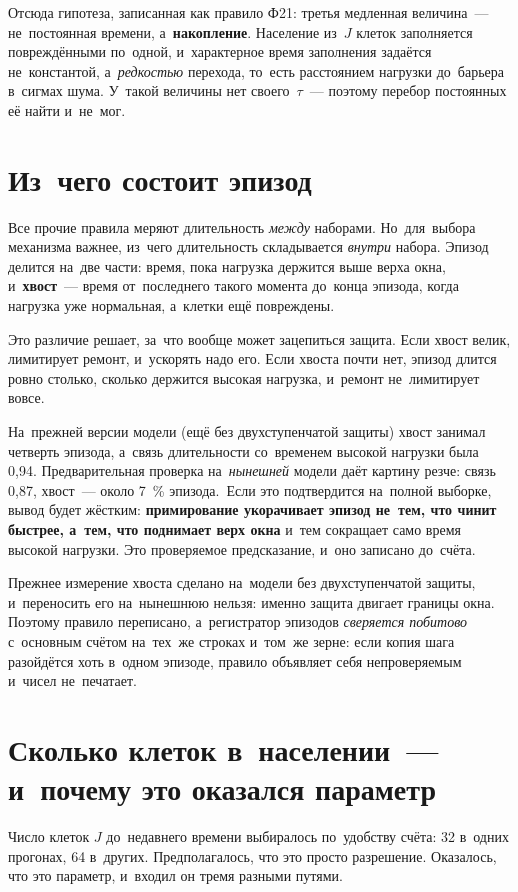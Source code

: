 Отсюда гипотеза, записанная как правило Ф21: третья медленная величина~--- не~постоянная времени, а~\textbf{накопление}. Население из~$J$ клеток заполняется повреждёнными по~одной, и~характерное время заполнения задаётся не~константой, а~\emph{редкостью} перехода, то~есть расстоянием нагрузки до~барьера в~сигмах шума. У~такой величины нет своего~$\tau$~--- поэтому перебор постоянных её найти и~не~мог.

\section{Из~чего состоит эпизод}\label{sec:tail}
Все прочие правила меряют длительность \emph{между} наборами. Но~для~выбора механизма важнее, из~чего длительность складывается \emph{внутри} набора. Эпизод делится на~две части: время, пока нагрузка держится выше верха окна, и~\textbf{хвост}~--- время от~последнего такого момента до~конца эпизода, когда нагрузка уже нормальная, а~клетки ещё повреждены.

Это различие решает, за~что вообще может зацепиться защита. Если хвост велик, лимитирует ремонт, и~ускорять надо его. Если хвоста почти нет, эпизод длится ровно столько, сколько держится высокая нагрузка, и~ремонт не~лимитирует вовсе.

На~прежней версии модели (ещё без двухступенчатой защиты) хвост занимал четверть эпизода, а~связь длительности со~временем высокой нагрузки была 0,94. Предварительная проверка на~\emph{нынешней} модели даёт картину резче: связь 0,87, хвост~--- около 7~\% эпизода.\tD\ Если это подтвердится на~полной выборке, вывод будет жёстким: \textbf{примирование укорачивает эпизод не~тем, что чинит быстрее, а~тем, что поднимает верх окна} и~тем сокращает само время высокой нагрузки. Это проверяемое предсказание, и~оно записано до~счёта.

\begin{note}
Прежнее измерение хвоста сделано на~модели без двухступенчатой защиты, и~переносить его на~нынешнюю нельзя: именно защита двигает границы окна. Поэтому правило переписано, а~регистратор эпизодов \emph{сверяется побитово} с~основным счётом на~тех~же строках и~том~же зерне: если копия шага разойдётся хоть в~одном эпизоде, правило объявляет себя непроверяемым и~чисел не~печатает.
\end{note}

\section{Сколько клеток в~населении~--- и~почему это оказался параметр}\label{sec:J}
Число клеток $J$ до~недавнего времени выбиралось по~удобству счёта: 32 в~одних прогонах, 64 в~других. Предполагалось, что это просто разрешение. Оказалось, что это параметр, и~входил он тремя разными путями.

